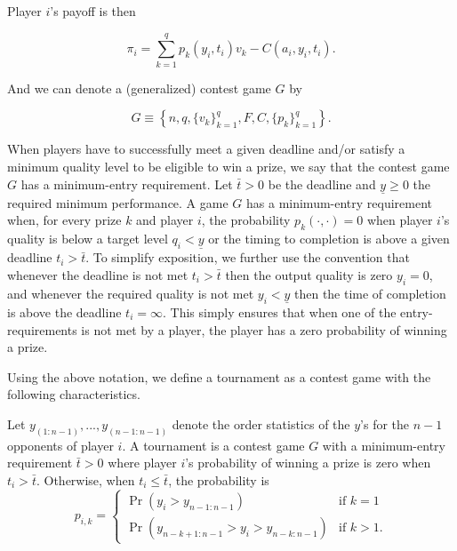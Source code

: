 \documentclass[12pt,]{article}
\theoremstyle{plain} %
\newcommand\deadline{\bar{t}}
\newcommand\target{\underline{y}}
\begin{document}
Player \(i\)'s payoff is then

\begin{equation}
  \label{expected payoff}
  \pi_i = \sum_{k=1}^{q} p_{k}(y_i, t_i) v_k - C(a_i, y_i, t_i). 
\end{equation}

And we can denote a (generalized) contest game \(G\) by

\begin{equation}
G \equiv \left\{
    n, q, \{v_k\}_{k=1}^{q},  F, C, \{p_{k}\}_{k=1}^{q} 
  \right\}.
\end{equation}

When players have to successfully meet a given deadline and/or satisfy a
minimum quality level to be eligible to win a prize, we say that the
contest game \(G\) has a minimum-entry requirement. Let \(\deadline>0\)
be the deadline and \(\target\geq 0\) the required minimum performance.
A game \(G\) has a minimum-entry requirement when, for every prize \(k\)
and player \(i\), the probability \(p_{k}(\cdot, \cdot)=0\) when player
\(i\)'s quality is below a target level \(q_i < \target\) or the timing
to completion is above a given deadline \(t_i>\deadline\). To simplify
exposition, we further use the convention that whenever the deadline is
not met \(t_i> \deadline\) then the output quality is zero \(y_i=0\),
and whenever the required quality is not met \(y_i<\target\) then the
time of completion is above the deadline \(t_i = \infty\). This simply
ensures that when one of the entry-requirements is not met by a player,
the player has a zero probability of winning a prize.

Using the above notation, we define a tournament as a contest game with
the following characteristics.

\begin{definition}[Tournament] \label{tournament}
Let $y_{(1:n-1)}, ..., y_{(n-1:n-1)}$ denote the order statistics of the $y$'s for the $n-1$ opponents of player $i$. A tournament is a contest game $G$ with a minimum-entry requirement $\deadline>0$ where player $i$'s probability of winning a prize is zero when $t_i > \deadline$. Otherwise, when $t_i\leq\deadline$, the probability is 
\begin{equation}
  p_{i, k} =
  \begin{cases}
    \Pr(y_i > y_{n-1:n-1}) & \text{if }k=1\\
    \Pr(y_{n-k+1:n-1} > y_i > y_{n-k:n-1}) & \text{if }k>1.
  \end{cases}
\end{equation}
\end{definition}
\end{document}
